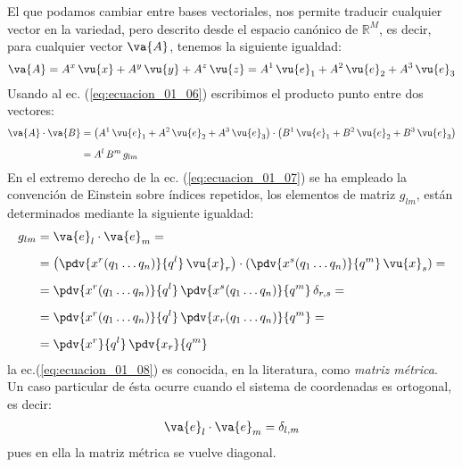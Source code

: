 \par
El que podamos cambiar entre bases vectoriales, nos permite traducir cualquier vector en la variedad,
pero descrito desde el espacio canónico de $\mathbb{R}^{M}$, es decir, para cualquier vector $\va{A}$, tenemos la siguiente igualdad:
\begin{align}
\va{A} = A^{x} \, \vu{x} + A^{y} \, \vu{y} + A^{z} \, \vu{z} = A^{1} \, \vu{e}_{1} + A^{2} \, \vu{e}_{2} + A^{3} \, \vu{e}_{3}
\label{eq:ecuacion_01_06}
\end{align}
Usando al ec. (\ref{eq:ecuacion_01_06}) escribimos el producto punto entre dos vectores:
\begin{align}
\begin{aligned}
\va{A} \cdot \va{B} &= \left( A^{1} \, \vu{e}_{1} + A^{2} \, \vu{e}_{2} + A^{3} \, \vu{e}_{3} \right) \cdot \left( B^{1} \, \vu{e}_{1} + B^{2} \, \vu{e}_{2} + B^{3} \, \vu{e}_{3} \right) \\[0.5em]
&= A^{l} \, B^{m} \, g_{lm}
\end{aligned}
\label{eq:ecuacion_01_07}
\end{align}
En el extremo derecho de la ec. (\ref{eq:ecuacion_01_07}) se ha empleado la convención de Einstein sobre índices repetidos, los elementos de matriz $g_{lm}$, están determinados mediante la siguiente igualdad:
\begin{align}
\begin{aligned}[b]
g_{lm} &= \va{e}_{l} \cdot \va{e}_{m} = \\[0.5em]
&= \left( \pdv{x^{r} (q_{1} \ldots q_{n})}{q^{l}} \, \vu{x}_{r} \right) \cdot \left( \pdv{x^{s} (q_{1} \ldots q_{n})}{q^{m}} \, \vu{x}_{s} \right) = \\[0.5em]
&= \pdv{x^{r} (q_{1} \ldots q_{n})}{q^{l}} \, \pdv{x^{s} (q_{1} \ldots q_{n})}{q^{m}} \, \delta_{r,s} = \\[0.5em]
&= \pdv{x^{r} (q_{1} \ldots q_{n})}{q^{l}} \, \pdv{x_{r} (q_{1} \ldots q_{n})}{q^{m}} = \\[0.5em]
&= \pdv{x^{r}}{q^{l}} \, \pdv{x_{r}}{q^{m}}
\end{aligned}
\label{eq:ecuacion_01_08}
\end{align}
la ec.(\ref{eq:ecuacion_01_08}) es conocida, en la literatura, como \emph{matriz métrica}. Un caso particular de ésta ocurre cuando el sistema de coordenadas es ortogonal, es decir: 
\begin{align*}
\va{e}_{l} \cdot \va{e}_{m} = \delta_{l,m}
\end{align*}
pues en ella la matriz métrica se vuelve diagonal.
